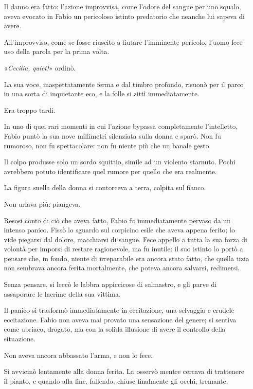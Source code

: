 Il danno era fatto: l'azione improvvisa, come l'odore del sangue per uno squalo, aveva evocato in Fabio un pericoloso istinto predatorio che neanche lui sapeva di avere.

All'improvviso, come se fosse riuscito a fiutare l'imminente pericolo, l'uomo fece uso della parola per la prima volta.

«\emph{Cecilia, quiet!}» ordinò.

La sua voce, inaspettatamente ferma e dal timbro profondo, risuonò per il parco in una sorta di inquietante eco, e la folle si zittì immediatamente.

Era troppo tardi.

In uno di quei rari momenti in cui l'azione bypassa completamente l'intelletto, Fabio puntò la sua nove millimetri silenziata sulla donna e sparò. Non fu rumoroso, non fu spettacolare: non fu niente più che un banale gesto.

Il colpo produsse solo un sordo squittio, simile ad un violento starnuto. Pochi avrebbero potuto identificare quel rumore per quello che era realmente.

La figura snella della donna si contorceva a terra, colpita sul fianco.

Non urlava più: piangeva.

Resosi conto di ciò che aveva fatto, Fabio fu immediatamente pervaso da un intenso panico. Fissò lo sguardo sul corpicino esile che aveva appena ferito; lo vide piegarsi dal dolore, macchiarsi di sangue. Fece appello a tutta la sua forza di volontà per imporsi di restare ragionevole, ma fu inutile: il suo istinto lo portò a pensare che, in fondo, niente di irreparabile era ancora stato fatto, che quella tizia non sembrava ancora ferita mortalmente, che poteva ancora salvarsi, redimersi.

Senza pensare, si leccò le labbra appiccicose di salmastro, e gli parve di assaporare le lacrime della sua vittima.

Il panico si trasformò immediatamente in eccitazione, una selvaggia e crudele eccitazione. Fabio non aveva mai provato una sensazione del genere; si sentiva come ubriaco, drogato, ma con la solida illusione di avere il controllo della situazione.

Non aveva ancora abbassato l'arma, e non lo fece.

Si avvicinò lentamente alla donna ferita. La osservò mentre cercava di trattenere il pianto, e quando alla fine, fallendo, chiuse finalmente gli occhi, tremante.

